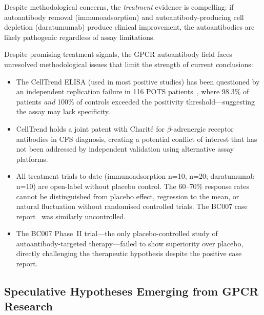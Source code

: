 Despite methodological concerns, the \textit{treatment} evidence is compelling: if autoantibody removal (immunoadsorption) and autoantibody-producing cell depletion (daratumumab) produce clinical improvement, the autoantibodies are likely pathogenic regardless of assay limitations.

\begin{limitation}
Despite promising treatment signals, the GPCR autoantibody field faces unresolved methodological issues that limit the strength of current conclusions:
\begin{itemize}
    \item The CellTrend ELISA (used in most positive studies) has been questioned by an independent replication failure in 116 POTS patients~\cite{POTS2022failed_replication}, where 98.3\% of patients \emph{and} 100\% of controls exceeded the positivity threshold---suggesting the assay may lack specificity.
    \item CellTrend holds a joint patent with Charit\'{e} for $\beta$-adrenergic receptor antibodies in CFS diagnosis, creating a potential conflict of interest that has not been addressed by independent validation using alternative assay platforms.
    \item All treatment trials to date (immunoadsorption n=10, n=20; daratumumab n=10) are open-label without placebo control. The 60--70\% response rates cannot be distinguished from placebo effect, regression to the mean, or natural fluctuation without randomised controlled trials. The BC007 case report~\cite{Hohberger2021bc007} was similarly uncontrolled.
    \item The BC007 Phase~II trial---the only placebo-controlled study of autoantibody-targeted therapy---failed to show superiority over placebo, directly challenging the therapeutic hypothesis despite the positive case report.
\end{itemize}
\end{limitation}

\subsection{Speculative Hypotheses Emerging from GPCR Research}

